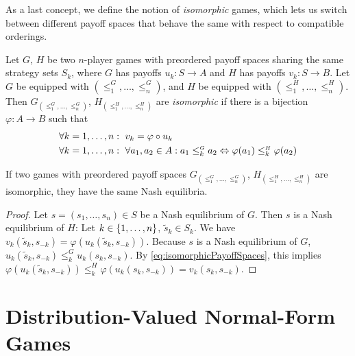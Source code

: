\documentclass[a4paper]{scrreprt}
\let\phi\varphi
\newcommand{\D}{\mathcal{D}}
\begin{document}
    As a last concept, we define the notion of \emph{isomorphic} games, which lets us switch between different payoff spaces that behave the same with respect to compatible orderings.
    \begin{defn}
        Let $G$, $H$ be two $n$-player games with preordered payoff spaces sharing the same strategy sets $S_k$, where $G$ has payoffs $u_k: S \to A$ and $H$ has payoffs $v_k: S \to B$.
        Let $G$ be equipped with $(\leq_1^{\scriptscriptstyle G}, \dots, \leq_n^{\scriptscriptstyle G})$, and $H$ be equipped with $(\leq_1^{\scriptscriptstyle H}, \dots, \leq_n^{\scriptscriptstyle H})$.
        Then $G_{(\leq_1^{\scriptscriptstyle G}, \dots, \leq_n^{\scriptscriptstyle G})}$, $H_{(\leq_1^{\scriptscriptstyle H}, \dots, \leq_n^{\scriptscriptstyle H})}$
        are \emph{isomorphic} if there is a bijection $\phi: A \to B$ such that
        \begin{align}
            &\forall k  = 1, \dots, n:~ v_k = \phi \circ u_k \\
            &\forall k  = 1, \dots, n:~ \forall a_1, a_2 \in A: a_1 \leq_k^{\scriptscriptstyle G} a_2 \lra \phi(a_1) \leq_k^{\scriptscriptstyle H} \phi(a_2)
            \label{eq:isomorphicPayoffSpaces}
        \end{align}
    \end{defn}
    
    \begin{lemma}
        If two games with preordered payoff spaces $G_{(\leq_1^{\scriptscriptstyle G}, \dots, \leq_n^{\scriptscriptstyle G})}$, $H_{(\leq_1^{\scriptscriptstyle H}, \dots, \leq_n^{\scriptscriptstyle H})}$ are isomorphic,
        they have the same Nash equilibria.
    \end{lemma}
    \begin{proof}
        Let $s = (s_1, \dots, s_n) \in S$ be a Nash equilibrium of $G$.
        Then $s$ is a Nash equilibrium of $H$: Let $k \in \{1, \dots, n\}$, $\tilde{s}_k \in S_k$.
        We have $v_k(\tilde{s}_k, s_{-k}) = \phi(u_k(\tilde{s}_k, s_{-k}))$. Because $s$ is a Nash equilibrium of $G$, $u_k(\tilde{s}_k, s_{-k}) \leq_k^{\scriptscriptstyle G} u_k(s_k, s_{-k})$.
        By \eqref{eq:isomorphicPayoffSpaces}, this implies $\phi(u_k(\tilde{s}_k, s_{-k})) \leq_k^{\scriptscriptstyle H} \phi(u_k(s_k, s_{-k})) = v_k(s_k, s_{-k})$.
    \end{proof}
    
    \section{Distribution-Valued Normal-Form Games}
    \label{sec:distributionValuedNormalFormGames}
    \newcommand{\DP}{\D} %
    \newcommand{\Dgeqzero}{\DP_{\geq0}}
    \newcommand{\Dgeqone}{\DP_{\geq1}}
    \newcommand{\Dab}{\DP_{[a, b]}}
    
\end{document}
